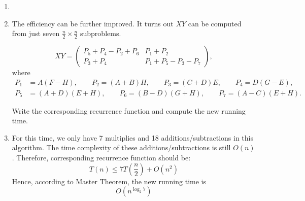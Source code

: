 \documentclass[12pt,a4paper]{article}
\makeatletter
\newtheorem*{solution}{Solution}
\theoremstyle{definition}
\renewenvironment{solution}[1][Solution] {\par\pushQED{\qed}\normalfont\topsep6\p@\@plus6\p@\relax\trivlist\item[\hskip\labelsep\bfseries#1\@addpunct{.}]\ignorespaces}{\popQED\endtrivlist\@endpefalse} \makeatother
\makeatother
\begin{document}
\begin{enumerate}
\begin{enumerate}
\begin{solution}
\end{solution}

\item The efficiency can be further improved. It turns out $XY$ can be computed from just seven $\frac{n}{2}\times \frac{n}{2}$ subproblems.

\begin{displaymath}
 XY=
\left(\begin{array}{c|c}
P_{5}+P_{4}-P_{2}+P_{6} & P_{1}+P_{2} \\
\hline
P_{3}+P_{4} & P_{1}+P_{5}-P_{3}-P_{7} \end{array}\right),
\end{displaymath}
where
\begin{align*}
P_{1}&=A(F-H), \qquad P_{2}=(A+B)H, \qquad P_{3}=(C+D)E, \qquad P_{4}=D(G-E),\\
P_{5}&=(A+D)(E+H),\qquad P_{6}=(B-D)(G+H),\qquad P_{7}=(A-C)(E+H).
\end{align*}

Write the corresponding recurrence function and compute the new running time.
\begin{solution}
For this time, we only have 7 multiplies and 18 additions/subtractions in this algorithm. The time complexity of these additions/subtractions is still $O(n)$. Therefore, corresponding recurrence function should be:$$T(n)\leq 7T(\frac{n}{2})+O(n^2)$$
Hence, according to Master Theorem, the new running time is $$O(n^{\log_{2} {7}})$$
\end{solution}
\end{enumerate}


\end{enumerate}

\end{document}
